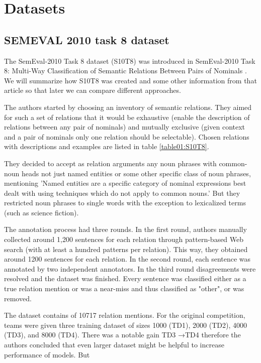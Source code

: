 \chapter{Datasets}



\section{SEMEVAL 2010 task 8 dataset}
The SemEval-2010 Task 8 dataset (S10T8) was introduced in SemEval-2010 Task 8: Multi-Way Classification of Semantic Relations Between Pairs of Nominals \cite{semeval}. We will summarize how S10T8 was created and some other information from that article so that later we can compare different approaches.


The authors started by choosing an inventory of semantic relations. They aimed for such a set of relations that it would be exhaustive (enable the description of relations between any pair of nominals) and mutually exclusive (given context and a pair of nominals only one relation should be selectable).  Chosen relations with descriptions and examples are listed in table \ref{table01:S10T8}. 

They decided to accept as relation arguments any noun phrases with common-noun heads not just named entities or some other specific class of noun phrases, mentioning  'Named entities are a specific category of nominal expressions best dealt with using techniques which do not apply to common nouns.'  But they restricted noun phrases to single words with the exception to lexicalized terms (such as  science fiction).

The annotation process had three rounds. In the first round, authors manually collected around 1,200 sentences for each relation through pattern-based Web search (with at least a hundred patterns per relation). This way, they obtained around 1200 sentences for each relation. In the second round, each sentence was annotated by two independent annotators. In the third round disagreements were resolved and the dataset was finished. Every sentence was classified either as a true relation mention or was a  near-miss and thus classified as "other", or was removed.

The dataset contains of 10717 relation mentions. For the original competition, teams were given three training dataset of sizes 1000 (TD1), 2000 (TD2), 4000 (TD3), and 8000 (TD4). There was a notable gain TD3 →TD4 therefore the authors concluded that even larger dataset might be helpful to increase performance of models. But 



